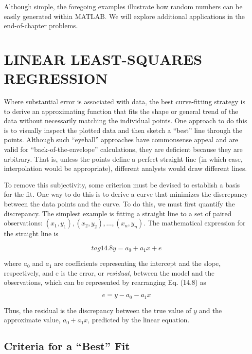 \documentclass[../main.tex]{subfiles}
\begin{document}
Although simple, the foregoing examples illustrate how random numbers can be easily generated within MATLAB. We will explore additional applications in the end-of-chapter problems.

\label{cha:cha_P_14_3}
\section{LINEAR LEAST-SQUARES REGRESSION}

\noindent Where substantial error is associated with data, the best curve-fitting strategy is to derive
an approximating function that fits the shape or general trend of the data without necessarily matching the individual points. One approach to do this is to visually inspect the
plotted data and then sketch a ``best'' line through the points. Although such ``eyeball''
approaches have commonsense appeal and are valid for ``back-of-the-envelope'' calculations, they are deficient because they are arbitrary. That is, unless the points define a perfect
straight line (in which case, interpolation would be appropriate), different analysts would
draw different lines.

To remove this subjectivity, some criterion must be devised to establish a basis for the
fit. One way to do this is to derive a curve that minimizes the discrepancy between the data
points and the curve. To do this, we must first quantify the discrepancy. The simplest example is fitting a straight line to a set of paired observations: $(x_1 , y_1 ), (x_2 , y_2 ), \dots , (x_n , y_n )$.
The mathematical expression for the straight line is

\begin{equation}
	tag{14.8}
	y = a_0 + a_1 x +e
\end{equation}

where $a_0$ and $a_1$ are coefficients representing the intercept and the slope, respectively, and
e is the error, or \textit{residual}, between the model and the observations, which can be represented by rearranging Eq. (14.8) as

\begin{equation}
	\tag{14.9}
	e = y - a_0 - a_1 x
\end{equation}

\noindent Thus, the residual is the discrepancy between the true value of $y$ and the approximate value,
$a_0 + a_1 x$, predicted by the linear equation.

\label{cha:cha_P_14_3_1}
\subsection{Criteria for a ``Best'' Fit}
\end{document}
